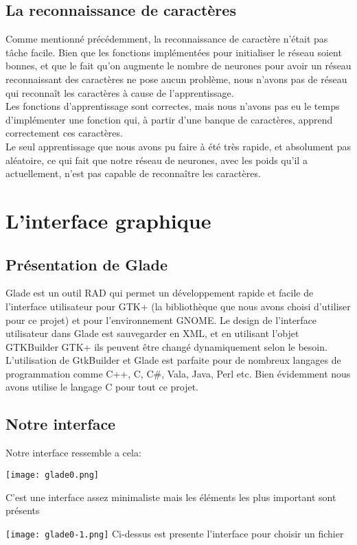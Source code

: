 \documentclass[14pt]{article}
\begin{document}
\subsection{La reconnaissance de caractères}
Comme mentionné précédemment, la reconnaissance de caractère n'était pas tâche facile. Bien que les fonctions implémentées pour initialiser le réseau soient bonnes, et que le fait qu'on augmente le nombre de neurones pour avoir un réseau reconnaissant des caractères ne pose aucun problème, nous n'avons pas de réseau qui reconnaît les caractères à cause de l'apprentissage.\\
Les fonctions d'apprentissage sont correctes, mais nous n'avons pas eu le temps d'implémenter une fonction qui, à partir d'une banque de caractères, apprend correctement ces caractères.\\
Le seul apprentissage que nous avons pu faire à été très rapide, et absolument pas aléatoire, ce qui fait que notre réseau de neurones, avec les poids qu'il a actuellement, n'est pas capable de reconnaître les caractères.
\newpage
\section{L'interface graphique} 
\subsection{Pr\'esentation de Glade}
Glade est un outil RAD qui permet un développement rapide et facile de l'interface utilisateur pour GTK+ (la bibliothèque que nous avons choisi d'utiliser pour ce projet) et pour l'environnement GNOME. 
Le design de l'interface utilisateur dans Glade est sauvegarder en XML, et en utilisant l'objet GTKBuilder GTK+ ils peuvent être changé dynamiquement selon le besoin.
L'utilisation de GtkBuilder et Glade est parfaite pour de nombreux langages de programmation comme C++, C, C\#, Vala, Java, Perl etc. 
Bien évidemment nous avons utilise le langage C pour tout ce projet.
\newpage
\subsection{Notre interface}
Notre interface ressemble a cela: 
\begin{center}
\texttt{[image: glade0.png]}

C'est une interface assez minimaliste mais les éléments les plus important sont présents
\end{center}
\newpage
\begin{center}
\texttt{[image: glade0-1.png]}
Ci-dessus est presente l'interface pour choisir un fichier
\end{center}
\end{document}
